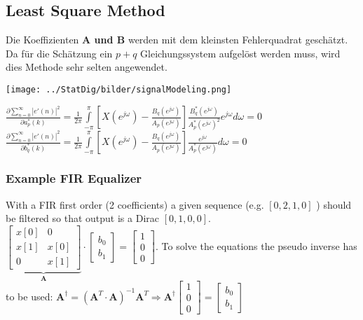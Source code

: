 \subsection{Least Square Method }
Die Koeffizienten \textbf{A und B} werden mit dem kleinsten Fehlerquadrat geschätzt. Da für die Schätzung ein $p+q$ Gleichungssystem aufgelöst 
werden muss, wird dies Methode sehr selten angewendet.\\
\begin{minipage}{8cm}
	\texttt{[image: ../StatDig/bilder/signalModeling.png]}
\end{minipage}
\begin{minipage}{10cm}
$\frac{\partial \sum\limits_{n=0}^{\infty}|e'(n)|^2}{\partial a_p^*(k)}=\frac{1}{2\pi} \int\limits_{-\pi}^{\pi}\left[X(e^{j\omega})-
\frac{B_q(e^{j\omega})}{A_p (e^{j\omega})}\right]\frac{B^*_q(e^{j\omega})}{A_p^* (e^{j\omega})^2}e^{j\omega} d\omega=0$\\
$\frac{\partial \sum\limits_{n=0}^{\infty}|e'(n)|^2}{\partial b_q^*(k)}=\frac{1}{2\pi} \int\limits_{-\pi}^{\pi}\left[X(e^{j\omega})-
\frac{B_q(e^{j\omega})}{A_p (e^{j\omega})}\right]\frac{e^{j\omega}}{A_p^* (e^{j\omega})} d\omega=0$\\
\end{minipage} 
\subsubsection{Example FIR Equalizer}
With a FIR first order (2 coefficients) a given sequence (e.g. $[0, 2, 1, 0]$ ) should be filtered so that output is a Dirac $[0, 1 , 0 , 0]$.\\
$\underbrace{\begin{bmatrix}
x[0] 	& 0 	\\
x[1]	& x[0]	\\
0		& x[1]
\end{bmatrix}}_{\bm A}
\cdot \begin{bmatrix}
b_0\\
b_1
\end{bmatrix}=\begin{bmatrix}
1\\
0\\
0
\end{bmatrix}$. To solve the equations the pseudo inverse has to be used: $\bm A^{\dagger} = \left(\bm A^T \cdot \bm A\right)^{-1}\bm A^T 
\Rightarrow \bm  A^\dagger \begin{bmatrix}
1\\
0\\
0
\end{bmatrix}=\begin{bmatrix}
b_0\\
b_1
\end{bmatrix}$

